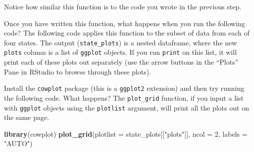 \documentclass[]{book}
\makeatletter
\newenvironment{Shaded}{\begin{snugshade}}{\end{snugshade}}
\newcommand{\KeywordTok}[1]{\textcolor[rgb]{0.13,0.29,0.53}{\textbf{#1}}}
\newcommand{\DataTypeTok}[1]{\textcolor[rgb]{0.13,0.29,0.53}{#1}}
\newcommand{\DecValTok}[1]{\textcolor[rgb]{0.00,0.00,0.81}{#1}}
\newcommand{\StringTok}[1]{\textcolor[rgb]{0.31,0.60,0.02}{#1}}
\newcommand{\OperatorTok}[1]{\textcolor[rgb]{0.81,0.36,0.00}{\textbf{#1}}}
\newcommand{\NormalTok}[1]{#1}
\newenvironment{kframe}{%
\medskip{}
\setlength{\fboxsep}{.8em}
 \def\at@end@of@kframe{}%
 \ifinner\ifhmode%
  \def\at@end@of@kframe{\end{minipage}}%
  \begin{minipage}{\columnwidth}%
 \fi\fi%
 \def\FrameCommand##1{\hskip\@totalleftmargin \hskip-\fboxsep
 \colorbox{shadecolor}{##1}\hskip-\fboxsep
     \hskip-\linewidth \hskip-\@totalleftmargin \hskip\columnwidth}%
 \MakeFramed {\advance\hsize-\width
   \@totalleftmargin\z@ \linewidth\hsize
   \@setminipage}}%
 {\par\unskip\endMakeFramed%
 \at@end@of@kframe}
\renewenvironment{Shaded}{\begin{kframe}}{\end{kframe}}
\theoremstyle{definition}
\theoremstyle{definition}
\theoremstyle{definition}
\theoremstyle{remark}
\makeatother
\begin{document}
Notice how similar this function is to the code you wrote in the
previous step.

Once you have written this function, what happens when you run the
following code? The following code applies this function to the subset
of data from each of four states. The output (\texttt{state\_plots}) is
a nested dataframe, where the new \texttt{plots} column is a list of
\texttt{ggplot} objects. If you run \texttt{print} on this list, it will
print each of these plots out separately (use the arrow buttons in the
``Plots'' Pane in RStudio to browse through these plots).

\begin{Shaded}
\end{Shaded}

Install the \texttt{cowplot} package (this is a \texttt{ggplot2}
extension) and then try running the following code. What happens? The
\texttt{plot\_grid} function, if you input a list with \texttt{ggplot}
objects using the \texttt{plotlist} argument, will print all the plots
out on the same page.

\begin{Shaded}
\begin{Highlighting}[]
\KeywordTok{library}\NormalTok{(cowplot)}
\KeywordTok{plot_grid}\NormalTok{(}\DataTypeTok{plotlist =}\NormalTok{ state_plots[[}\StringTok{"plots"}\NormalTok{]], }
          \DataTypeTok{ncol =} \DecValTok{2}\NormalTok{, }\DataTypeTok{labels =} \StringTok{"AUTO"}\NormalTok{)}
\end{Highlighting}
\end{Shaded}
\end{document}
